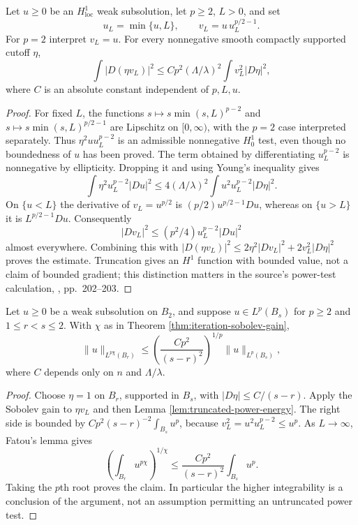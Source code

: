 \begin{lemma}\label{lem:truncated-power-energy}
Let $u\geq0$ be an $H^1_{\mathrm{loc}}$ weak subsolution, let $p\geq2$, $L>0$, and set
\[
 u_L=\min\{u,L\},\qquad v_L=u\,u_L^{p/2-1}.
\]
For $p=2$ interpret $v_L=u$. For every nonnegative smooth compactly supported cutoff $\eta$,
\[
 \int|D(\eta v_L)|^2
 \leq C p^2(\Lambda/\lambda)^2\int v_L^2|D\eta|^2,
\]
where $C$ is an absolute constant independent of $p,L,u$.
\end{lemma}
\begin{proof}
For fixed $L$, the functions $s\mapsto s\min(s,L)^{p-2}$ and $s\mapsto s\min(s,L)^{p/2-1}$ are Lipschitz on $[0,\infty)$, with the $p=2$ case interpreted separately. Thus $\eta^2u u_L^{p-2}$ is an admissible nonnegative $H_0^1$ test, even though no boundedness of $u$ has been proved. The term obtained by differentiating $u_L^{p-2}$ is nonnegative by ellipticity. Dropping it and using Young's inequality gives
\[
 \int\eta^2 u_L^{p-2}|Du|^2
 \leq4(\Lambda/\lambda)^2\int u^2u_L^{p-2}|D\eta|^2.
\]
On $\{u<L\}$ the derivative of $v_L=u^{p/2}$ is $(p/2)u^{p/2-1}Du$, whereas on $\{u>L\}$ it is $L^{p/2-1}Du$. Consequently
\[
 |Dv_L|^2\leq(p^2/4)u_L^{p-2}|Du|^2
\]
almost everywhere. Combining this with $|D(\eta v_L)|^2\leq2\eta^2|Dv_L|^2+2v_L^2|D\eta|^2$ proves the estimate. Truncation gives an $H^1$ function with bounded value, not a claim of bounded gradient; this distinction matters in the source's power-test calculation, \cite{SimonPDE}, pp.~202--203.
\end{proof}

\begin{lemma}\label{lem:moser-integrability-step}
Let $u\geq0$ be a weak subsolution on $B_2$, and suppose $u\in L^p(B_s)$ for $p\geq2$ and $1\leq r<s\leq2$. With $\chi$ as in Theorem \ref{thm:iteration-sobolev-gain},
\[
 \|u\|_{L^{p\chi}(B_r)}
 \leq\left(\frac{C p^2}{(s-r)^2}\right)^{1/p}\|u\|_{L^p(B_s)},
\]
where $C$ depends only on $n$ and $\Lambda/\lambda$.
\end{lemma}
\begin{proof}
Choose $\eta=1$ on $B_r$, supported in $B_s$, with $|D\eta|\leq C/(s-r)$. Apply the Sobolev gain to $\eta v_L$ and then Lemma \ref{lem:truncated-power-energy}. The right side is bounded by $Cp^2(s-r)^{-2}\int_{B_s}u^p$, because $v_L^2=u^2u_L^{p-2}\leq u^p$. As $L\to\infty$, Fatou's lemma gives
\[
 \left(\int_{B_r}u^{p\chi}\right)^{1/\chi}
 \leq\frac{Cp^2}{(s-r)^2}\int_{B_s}u^p.
\]
Taking the $p$th root proves the claim. In particular the higher integrability is a conclusion of the argument, not an assumption permitting an untruncated power test.
\end{proof}

